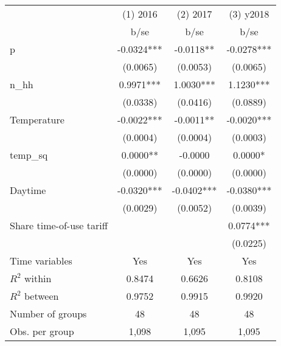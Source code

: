 \begin{tabular}{lccc}\toprule
                    &    (1) 2016   &    (2) 2017   &   (3) y2018   \\
                    &        b/se   &        b/se   &        b/se   \\
\midrule
p                   &     -0.0324***&     -0.0118** &     -0.0278***\\
                    &    (0.0065)   &    (0.0053)   &    (0.0065)   \\
n_hh                &      0.9971***&      1.0030***&      1.1230***\\
                    &    (0.0338)   &    (0.0416)   &    (0.0889)   \\
Temperature         &     -0.0022***&     -0.0011** &     -0.0020***\\
                    &    (0.0004)   &    (0.0004)   &    (0.0003)   \\
temp_sq             &      0.0000** &     -0.0000   &      0.0000*  \\
                    &    (0.0000)   &    (0.0000)   &    (0.0000)   \\
Daytime             &     -0.0320***&     -0.0402***&     -0.0380***\\
                    &    (0.0029)   &    (0.0052)   &    (0.0039)   \\
Share time-of-use tariff&               &               &      0.0774***\\
                    &               &               &    (0.0225)   \\
Time variables      &         Yes   &         Yes   &         Yes   \\
\midrule
\(R^2\) within      &      0.8474   &      0.6626   &      0.8108   \\
\(R^2\) between     &      0.9752   &      0.9915   &      0.9920   \\
Number of groups    &          48   &          48   &          48   \\
Obs. per group      &       1,098   &       1,095   &       1,095   \\
\bottomrule\end{tabular}
